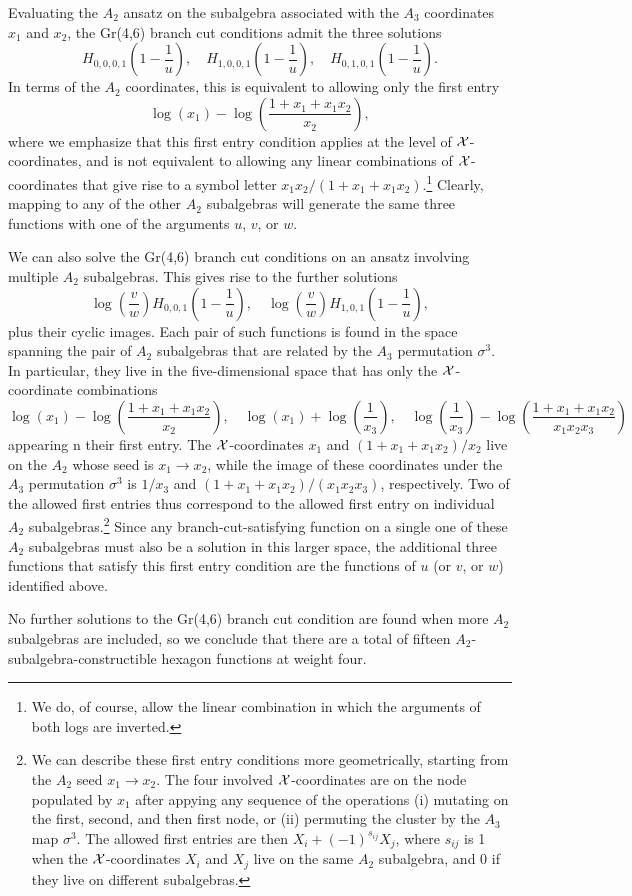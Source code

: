 \documentclass[12pt]{article}
\begin{document}
Evaluating the $A_2$ ansatz on the subalgebra associated with the $A_3$ coordinates $x_1$ and $x_2$, the Gr(4,6) branch cut conditions admit the three solutions 
$$H_{0,0,0,1}\left(1-\frac1u \right), \quad H_{1,0,0,1}\left(1-\frac1u \right), \quad H_{0,1,0,1}\left(1-\frac1u \right).$$
In terms of the $A_2$ coordinates, this is equivalent to allowing only the first entry
$$\log (x_1)- \log \left ( \frac{1 + x_1 + x_1 x_2}{x_2} \right),$$
where we emphasize that this first entry condition applies at the level of ${\cal X}$-coordinates, and is not equivalent to allowing any linear combinations of ${\cal X}$-coordinates that give rise to a symbol letter $x_1 x_2/(1+x_1 + x_1 x_2)$.\footnote{We do, of course, allow the linear combination in which the arguments of both logs are inverted.} Clearly, mapping to any of the other $A_2$ subalgebras will generate the same three functions with one of the arguments $u$, $v$, or $w$.

We can also solve the Gr(4,6) branch cut conditions on an ansatz involving multiple $A_2$ subalgebras. This gives rise to the further solutions
$$\log \left( \frac v w \right) H_{0, 0, 1} \left(1-\frac1u \right), \quad  \log \left( \frac v w \right) H_{1, 0, 1} \left(1-\frac1u \right),$$
plus their cyclic images. Each pair of such functions is found in the space spanning the pair of $A_2$ subalgebras that are related by the $A_3$ permutation $\sigma^3$. In particular, they live in the five-dimensional space that has only the ${\cal X}$-coordinate combinations 
$$\log(x_1) -\log \left( \frac{1 + x_1 + x_1 x_2}{x_2} \right), \quad \log(x_1) + \log \left( \frac{1}{x_3} \right), \quad \log \left( \frac{1}{x_3} \right) - \log \left( \frac{1 + x_1 + x_1 x_2}{x_1 x_2 x_3} \right) $$
appearing n their first entry. The ${\cal X}$-coordinates $x_1$ and $(1 + x_1 + x_1 x_2)/x_2$ live on the $A_2$ whose seed is $x_1 \rightarrow x_2$, while the image of these coordinates under the $A_3$ permutation $\sigma^3$ is $1/x_3$ and $(1 + x_1 + x_1 x_2)/(x_1 x_2 x_3)$, respectively. Two of the allowed first entries thus correspond to the allowed first entry on individual $A_2$ subalgebras.\footnote{We can describe these first entry conditions more geometrically, starting from the $A_2$ seed $x_1\rightarrow x_2$. The four involved ${\cal X}$-coordinates are on the node populated by $x_1$ after appying any sequence of the operations (i) mutating on the first, second, and then first node, or (ii) permuting the cluster by the $A_3$ map $\sigma^3$. The allowed first entries are then $X_i + (-1)^{s_{ij}}X_j$, where $s_{ij}$ is 1 when the ${\cal X}$-coordinates $X_i$ and $X_j$ live on the same $A_2$ subalgebra, and 0 if they live on different subalgebras.} Since any branch-cut-satisfying function on a single one of these $A_2$ subalgebras must also be a solution in this larger space, the additional three functions that satisfy this first entry condition are the functions of $u$ (or $v$, or $w$) identified above. 

No further solutions to the Gr(4,6) branch cut condition are found when more $A_2$ subalgebras are included, so we conclude that there are a total of fifteen $A_2$-subalgebra-constructible hexagon functions at weight four.
\end{document}
